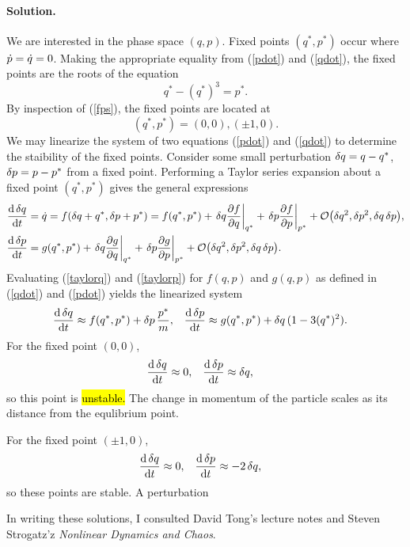 \documentclass[11pt]{article}
\newcommand{\refeq}[1]{(\ref{#1})}
\newenvironment{solution}
{
    \paragraph{Solution.}
    \ignorespaces
}
{
    \bigskip
}
\begin{document}
\begin{solution}
	We are interested in the phase space $(q, p)$.  Fixed points $(q^*, p^*)$ occur where $\dot{p} = \dot{q} = 0$.  Making the appropriate equality from \refeq{pdot} and \refeq{qdot}, the fixed points are the roots of the equation
	\begin{equation} \label{fps}
		q^* - (q^*)^3 = p^*.
	\end{equation}
	By inspection of \refeq{fps}, the fixed points are located at
	\begin{equation}
		(q^*, p^*) = (0,0), (\pm 1, 0).
	\end{equation}
	We may linearize the system of two equations \refeq{pdot} and \refeq{qdot} to determine the staibility of the fixed points.  Consider some small perturbation $\delta q = q - q^*$, $\delta p = p - p^*$ from a fixed point.  Performing a Taylor series expansion about a fixed point $(q^*, p^*)$ gives the general expressions
	\begin{align}
		\dv{\,\dlq}{t} &= \qd = f(\dlq + q^*, \dlp + p^*) = f(q^*, p^*) + \left. \dlq \pdv{f}{q} \right|_{q^*} + \left. \dlp \pdv{f}{p} \right|_{p^*} + \order{\dlq^2, \dlp^2, \dlq \,\dlp}, \label{taylorq} \\
		\dv{\,\dlp}{t} &= g(q^*, p^*) + \left. \dlq \pdv{g}{q} \right|_{q^*} + \left. \dlp \pdv{g}{p} \right|_{p^*} + \order{\dlq^2, \dlp^2, \dlq \,\dlp}. \label{taylorp}
	\end{align}
	Evaluating \refeq{taylorq} and \refeq{taylorp} for $f(q, p)$ and $g(q, p)$ as defined in \refeq{qdot} and \refeq{pdot} yields the linearized system
	\begin{align}
		\dv{\,\delta q}{t} &\approx f(q^*, p^*) + \delta p\, \frac{p^*}{m}, &
		\dv{\,\delta p}{t} &\approx g(q^*, p^*) + \delta q\, (1 - 3 (q^*)^2).
	\end{align}
	For the fixed point $(0, 0)$,
	\begin{align}
		\dv{\,\delta q}{t} &\approx 0, &
		\dv{\,\delta p}{t} &\approx \delta q,
	\end{align}
	so this point is \hl{unstable.}  The change in momentum of the particle scales as its distance from the equlibrium point.

	For the fixed point $(\pm 1, 0)$,
	\begin{align}
		\dv{\,\delta q}{t} &\approx 0, &
		\dv{\,\delta p}{t} &\approx -2 \,\delta q,
	\end{align}
	so these points are stable.  A perturbation 
\end{solution}
	
In writing these solutions, I consulted David Tong's lecture notes and Steven Strogatz'z \emph{Nonlinear Dynamics and Chaos}.
\end{document}
